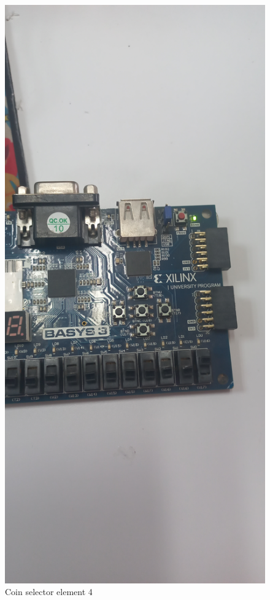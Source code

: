 \documentclass{article}
\begin{document}
\begin{multicols}{2}
	\begin{figure}[H]
		\centering
		\includegraphics[width=0.8\linewidth]{images/diagrams/coin-selector/coin-selector4.jpg}
		\caption{Coin selector element 4}
		\label{Coin selector element 4}
	\end{figure}


\end{multicols}
\end{document}
